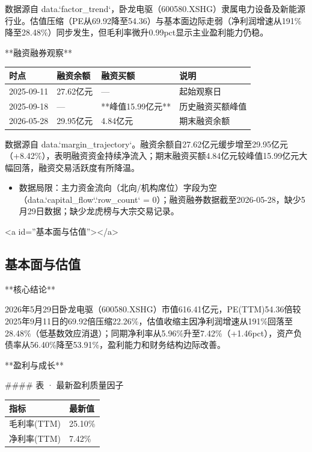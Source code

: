 \documentclass[12pt,a4paper]{article}
\begin{document}
数据源自 data.`factor\_trend`，卧龙电驱（600580.XSHG）隶属电力设备及新能源行业。估值压缩（PE从69.92降至54.36）与基本面边际走弱（净利润增速从191\%降至28.48\%）同步发生，但毛利率微升0.99pct显示主业盈利能力仍稳。

**融资融券观察**

\begin{table}[htbp]
\centering
\begin{tabular}{llll}
\toprule
时点 & 融资余额 & 融资买额 & 说明 \\
\midrule
2025-09-11 & 27.62亿元 & — & 起始观察日 \\
2025-09-18 & — & **峰值15.99亿元** & 历史融资买额峰值 \\
2026-05-28 & 29.95亿元 & 4.84亿元 & 期末融资余额 \\
\bottomrule
\end{tabular}
\end{table}


数据源自 data.`margin\_trajectory`。融资余额自27.62亿元缓步增至29.95亿元（+8.42\%），表明融资资金持续净流入；期末融资买额4.84亿元较峰值15.99亿元大幅回落，融资交易活跃度有所降温。

\begin{itemize}
\item 数据局限：主力资金流向（北向/机构席位）字段为空（data.`capital\_flow`.`row\_count` = 0）；融资融券数据截至2026-05-28，缺少5月29日数据；缺少龙虎榜与大宗交易记录。
\end{itemize}

<a id=''基本面与估值''></a>

\subsection{ 基本面与估值}

**核心结论**

2026年5月29日卧龙电驱（600580.XSHG）市值616.41亿元，PE(TTM)54.36倍较2025年9月11日的69.92倍压缩22.26\%，估值收缩主因净利润增速从191\%回落至28.48\%（低基数效应消退）；同期净利率从5.96\%升至7.42\%（+1.46pct），资产负债率从56.40\%降至53.91\%，盈利能力和财务结构边际改善。

**盈利与成长**

\#\#\#\# 表 · 最新盈利质量因子

\begin{table}[htbp]
\centering
\begin{tabular}{ll}
\toprule
指标 & 最新值 \\
\midrule
毛利率(TTM) & 25.10\% \\
净利率(TTM) & 7.42\% \\
\bottomrule
\end{tabular}
\end{table}
\end{document}
